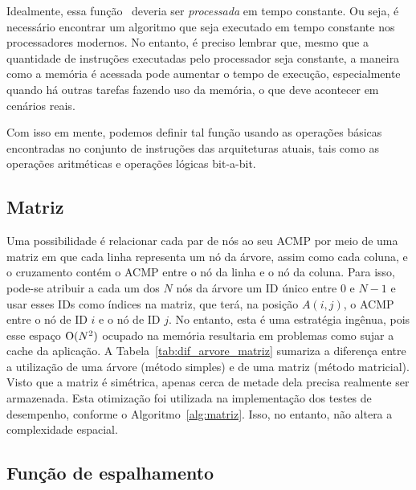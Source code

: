 Idealmente, essa função \ACMPIDs\ deveria ser \textit{processada} em tempo constante.
Ou seja, é necessário encontrar um algoritmo que seja executado em tempo constante nos processadores modernos.
No entanto, é preciso lembrar que, mesmo que a quantidade de instruções executadas pelo processador seja constante,
a maneira como a memória é acessada pode aumentar o tempo de execução, especialmente quando há outras tarefas fazendo uso da memória, o que deve acontecer em cenários reais.

Com isso em mente, podemos definir tal função usando as operações básicas encontradas no conjunto de instruções das arquiteturas atuais,
tais como as operações aritméticas e operações lógicas bit-a-bit.

\subsection{Matriz}

Uma possibilidade é relacionar cada par de nós ao seu ACMP por meio de uma matriz
em que cada linha representa um nó da árvore, assim como cada coluna, e o cruzamento contém o ACMP entre o nó da linha e o nó da coluna.
Para isso, pode-se atribuir a cada um dos $N$ nós da árvore um ID único entre $0$ e $N-1$ e usar esses IDs como índices na matriz,
que terá, na posição $A(i,j)$, o ACMP entre o nó de ID $i$ e o nó de ID $j$.
No entanto, esta é uma estratégia ingênua, pois esse espaço $\operatorname{O}(N^2)$ ocupado na memória resultaria em problemas como sujar a cache da aplicação.
A Tabela~\ref{tab:dif_arvore_matriz} sumariza a diferença entre a utilização de uma árvore (método simples) e de uma matriz (método matricial).
Visto que a matriz é simétrica, apenas cerca de metade dela precisa realmente ser armazenada.
Esta otimização foi utilizada na implementação dos testes de desempenho, conforme o Algoritmo~\ref{alg:matriz}.
Isso, no entanto, não altera a complexidade espacial.





\subsection{Função de espalhamento}

